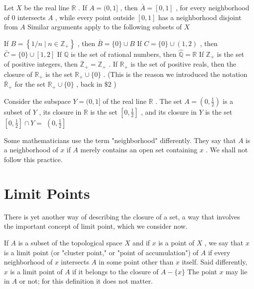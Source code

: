 \begin{example} Let \(X\) be the real line \(\mathbb{R}\) . If \(A = (0,1\rbrack\) , then \(\bar{A} = \left\lbrack  {0,1}\right\rbrack\) , for every neighborhood of 0 intersects \(A\) , while every point outside \(\left\lbrack  {0,1}\right\rbrack\) has a neighborhood disjoint from \(A\) Similar arguments apply to the following subsets of \(X\)

If \(B = \left\{  {1/n \mid  n \in  {\mathbb{Z}}_{ + }}\right\}\) , then \(\bar{B} = \{ 0\}  \cup  B\) If \(C = \{ 0\}  \cup  \left( {1,2}\right)\) , then \(\bar{C} = \{ 0\}  \cup  \left\lbrack  {1,2}\right\rbrack\) If \(\mathbb{Q}\) is the set of rational numbers, then \(\widehat{\mathbb{Q}} = \mathbb{R}\) If \({\mathbb{Z}}_{ + }\) is the set of positive integers, then \({\overline{\mathbb{Z}}}_{ + } = {\mathbb{Z}}_{ + }\) . If \({\mathbb{R}}_{ + }\) is the set of positive reals, then the closure of \({\mathbb{R}}_{ + }\) is the set \({\mathbb{R}}_{ + } \cup  \{ 0\}\) . (This is the reason we introduced the notation \({\overline{\mathbb{R}}}_{ + }\) for the set \({\mathbb{R}}_{ + } \cup  \{ 0\}\) , back in \(\$ 2\) )
\end{example}

\begin{example} Consider the subspace \(Y = (0,1\rbrack\) of the real line \(\mathbb{R}\) . The set \(A = \left( {0,\frac{1}{2}}\right)\) is a subset of \(Y\) , its closure in \(\mathbb{R}\) is the set \(\left\lbrack  {0,\frac{1}{2}}\right\rbrack\) , and its closure in \(Y\) is the set \(\left\lbrack  {0,\frac{1}{2}}\right\rbrack   \cap  Y =\)  \(\left( {0,\frac{1}{2}}\right\rbrack\)
\end{example}

Some mathematicians use the term "neighborhood" differently. They say that \(A\) is a neighborhood of \(x\) if \(A\) merely contains an open set containing \(x\) . We shall not follow this practice.

\section*{Limit Points}

There is yet another way of describing the closure of a set, a way that involves the important concept of limit point, which we consider now.

If \(A\) is a subset of the topological space \(X\) and if \(x\) is a point of \(X\) , we say that \(x\) is a limit point (or "cluster point," or "point of accumulation") of \(A\) if every neighborhood of \(x\) intersects \(A\) in some point other than \(x\) itself. Said differently, \(x\) is a limit point of \(A\) if it belongs to the closure of \(A - \{ x\}\) The point \(x\) may lie in \(A\) or not; for this definition it does not matter.

